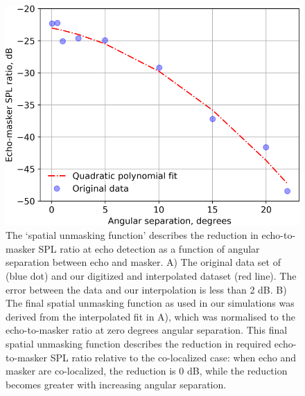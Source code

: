 \documentclass[
]{book}
\begin{document}
\begin{figure}
\includegraphics[]{original_papers/CPN_figures/Figures_SI/Figure_S2.png}
\centering
\caption{The ‘spatial unmasking function’ describes the reduction in echo-to-masker SPL ratio at echo detection as a function of angular separation between echo and masker. A) The original data set of \cite{suemer2009a} (blue dot) and our digitized and
interpolated dataset (red line). The error between the data and our interpolation is less than 2 dB. B) The final spatial unmasking function as used in our simulations was derived from the interpolated fit in A), which was normalised to the echo-to-masker ratio at zero degrees angular separation. This final spatial unmasking function describes the reduction in required echo-to-masker SPL ratio relative to the co-localized case: when echo and masker are co-localized, the reduction is 0 dB, while the reduction becomes greater with increasing angular separation.}
\label{cpn_figS2}
\end{figure}

\newpage
\end{document}
